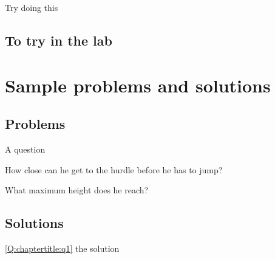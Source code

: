 \begin{tQuestion}Try doing this \end{tQuestion}

\subsection{To try in the lab}

\newpage
\section{Sample problems and solutions}
\subsection{Problems}
\begin{problemParts}{A question\label{Q:chaptertitle:q1}}
\item How close can he get to the hurdle before he has to jump?
\item What maximum height does he reach?
\end{problemParts}

\newpage
\subsection{Solutions}
\begin{solution}{\ref{Q:chaptertitle:q1}}
{
the solution
}
\end{solution}

